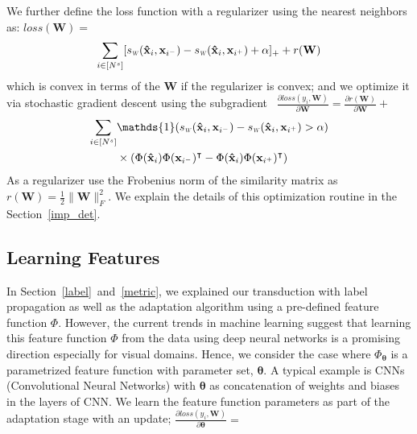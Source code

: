   
We further define the loss function with a regularizer using the nearest neighbors as: $loss(\mathbf{W})=$
\begin{equation}
 \sum_{i \in [N^s]} [\sw(\mathbf{\hat{x}}_i,\mathbf{x}_{i^-}) - \sw(\mathbf{\hat{x}}_i,\mathbf{x}_{i^+}) + \alpha]_{+} + r(\mathbf{W})
\end{equation}
which is convex in terms of the $\mathbf{W}$ if the regularizer is convex; and we optimize it via stochastic gradient descent using the subgradient \
\mbox{$\frac{\partial loss (y_i, \mathbf{W})}{\partial \mathbf{W}} = \frac{\partial r ( \mathbf{W})}{\partial \mathbf{W}} + $}
\begin{equation}
\begin{aligned}
\sum_{i \in [N^s]} &\mathds{1}(\sw(\xsi,\mathbf{x}_{i^-}) - \sw(\xsi,\mathbf{x}_{i^+})>\alpha) \\
&\times \left( \Phi(\xsi)\Phi(\mathbf{x}_{i^-})^\intercal - \Phi(\xsi)\Phi(\mathbf{x}_{i^+})^\intercal  \right)  
\end{aligned}
\label{gradw}
\end{equation}
As a regularizer use the Frobenius norm of the similarity matrix as $r(\mathbf{W})=\frac{1}{2}\|\mathbf{W}\|_F^2$. We explain the details of this optimization routine in the Section~\ref{imp_det}.


\subsection{Learning Features}
In Section~\ref{label}~and~\ref{metric}, we explained our transduction with label propagation as well as the adaptation algorithm using a pre-defined feature function $\Phi$. However, the current trends in machine learning suggest that learning this feature function $\Phi$ from the data using deep neural networks is a promising direction especially for visual domains. Hence, we consider the case where $\Phi_{\mathbf{\theta}}$ is a parametrized feature function with parameter set, $\mathbf{\theta}$. A typical example is CNNs (Convolutional Neural Networks) with $\mathbf{\theta}$ as concatenation of weights and biases in the layers of CNN. We learn the feature function parameters as part of the adaptation stage with an update; $\frac{\partial loss (y_i, \mathbf{W})}{\partial \mathbf{\theta}} =$

